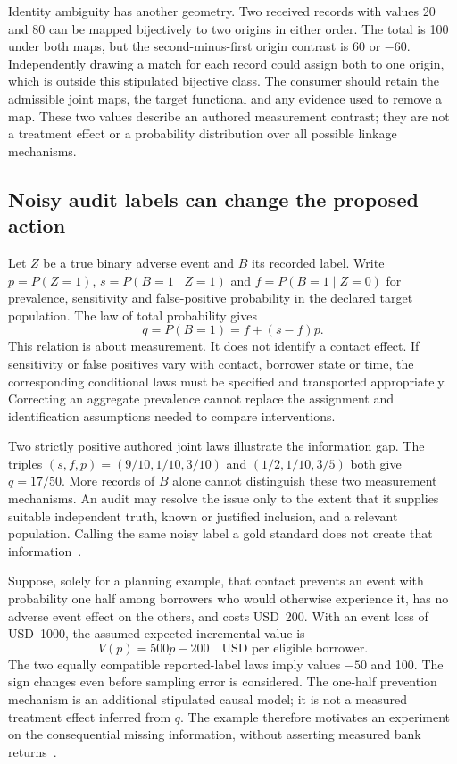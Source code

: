 Identity ambiguity has another geometry. Two received records with values
20 and 80 can be mapped bijectively to two origins in either order. The
total is 100 under both maps, but the second-minus-first origin contrast is
60 or $-60$. Independently drawing a match for each record could assign
both to one origin, which is outside this stipulated bijective class.
The consumer should retain the admissible joint maps, the target functional
and any evidence used to remove a map. These two values describe an authored
measurement contrast; they are not a treatment effect or a probability
distribution over all possible linkage mechanisms.

\subsection{Noisy audit labels can change the proposed action}

Let $Z$ be a true binary adverse event and $B$ its recorded label. Write
$p=P(Z=1)$, $s=P(B=1\mid Z=1)$ and $f=P(B=1\mid Z=0)$ for prevalence,
sensitivity and false-positive probability in the declared target population.
The law of total probability gives
\begin{equation}
 q=P(B=1)=f+(s-f)p.
 \label{exec13:observation-label-law}
\end{equation}
This relation is about measurement. It does not identify a contact effect.
If sensitivity or false positives vary with contact, borrower state or time,
the corresponding conditional laws must be specified and transported
appropriately. Correcting an aggregate prevalence cannot replace the
assignment and identification assumptions needed to compare interventions.

Two strictly positive authored joint laws illustrate the information gap.
The triples $(s,f,p)=(9/10,1/10,3/10)$ and $(1/2,1/10,3/5)$ both give
$q=17/50$. More records of $B$ alone cannot distinguish these two
measurement mechanisms. An audit may resolve the issue only to the extent
that it supplies suitable independent truth, known or justified inclusion,
and a relevant population. Calling the same noisy label a gold standard
does not create that information~\citep{exec13_observation_exact}.

Suppose, solely for a planning example, that contact prevents an event with
probability one half among borrowers who would otherwise experience it,
has no adverse event effect on the others, and costs USD~200. With an event
loss of USD~1000, the assumed expected incremental value is
\[
 V(p)=500p-200\quad\text{USD per eligible borrower}.
\]
The two equally compatible reported-label laws imply values $-50$ and
100. The sign changes even before sampling error is considered. The
one-half prevention mechanism is an additional stipulated causal model;
it is not a measured treatment effect inferred from $q$. The example
therefore motivates an experiment on the consequential missing information,
without asserting measured bank returns~\citep{exec13_observation_exact}.

